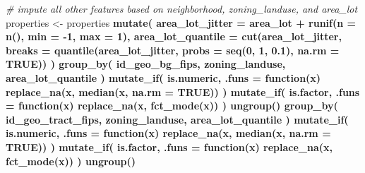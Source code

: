 \documentclass[]{book}
\newenvironment{Shaded}{\begin{snugshade}}{\end{snugshade}}
\newcommand{\KeywordTok}[1]{\textcolor[rgb]{0.13,0.29,0.53}{\textbf{#1}}}
\newcommand{\DataTypeTok}[1]{\textcolor[rgb]{0.13,0.29,0.53}{#1}}
\newcommand{\DecValTok}[1]{\textcolor[rgb]{0.00,0.00,0.81}{#1}}
\newcommand{\FloatTok}[1]{\textcolor[rgb]{0.00,0.00,0.81}{#1}}
\newcommand{\StringTok}[1]{\textcolor[rgb]{0.31,0.60,0.02}{#1}}
\newcommand{\CommentTok}[1]{\textcolor[rgb]{0.56,0.35,0.01}{\textit{#1}}}
\newcommand{\OtherTok}[1]{\textcolor[rgb]{0.56,0.35,0.01}{#1}}
\newcommand{\ControlFlowTok}[1]{\textcolor[rgb]{0.13,0.29,0.53}{\textbf{#1}}}
\newcommand{\OperatorTok}[1]{\textcolor[rgb]{0.81,0.36,0.00}{\textbf{#1}}}
\newcommand{\NormalTok}[1]{#1}
\theoremstyle{definition}
\theoremstyle{definition}
\theoremstyle{definition}
\theoremstyle{remark}
\begin{document}
\begin{Shaded}
\begin{Highlighting}[]
\CommentTok{# impute all other features based on neighborhood, zoning_landuse, and area_lot}
\NormalTok{properties <-}\StringTok{ }\NormalTok{properties }\OperatorTok{%
\StringTok{  }\KeywordTok{mutate}\NormalTok{(}
    \DataTypeTok{area_lot_jitter =}\NormalTok{ area_lot }\OperatorTok{+}\StringTok{ }\KeywordTok{runif}\NormalTok{(}\DataTypeTok{n =} \KeywordTok{n}\NormalTok{(), }\DataTypeTok{min =} \OperatorTok{-}\DecValTok{1}\NormalTok{, }\DataTypeTok{max =} \DecValTok{1}\NormalTok{),}
    \DataTypeTok{area_lot_quantile =} \KeywordTok{cut}\NormalTok{(area_lot_jitter, }
                            \DataTypeTok{breaks =} \KeywordTok{quantile}\NormalTok{(area_lot_jitter, }\DataTypeTok{probs =} \KeywordTok{seq}\NormalTok{(}\DecValTok{0}\NormalTok{, }\DecValTok{1}\NormalTok{, }\FloatTok{0.1}\NormalTok{), }\DataTypeTok{na.rm =} \OtherTok{TRUE}\NormalTok{))}
\NormalTok{    ) }\OperatorTok{%
\StringTok{  }\KeywordTok{group_by}\NormalTok{(}
\NormalTok{    id_geo_bg_fips,}
\NormalTok{    zoning_landuse,}
\NormalTok{    area_lot_quantile}
\NormalTok{  ) }\OperatorTok{%
\StringTok{  }\KeywordTok{mutate_if}\NormalTok{(}
\NormalTok{    is.numeric, }\DataTypeTok{.funs =} \ControlFlowTok{function}\NormalTok{(x) }\KeywordTok{replace_na}\NormalTok{(x, }\KeywordTok{median}\NormalTok{(x, }\DataTypeTok{na.rm =} \OtherTok{TRUE}\NormalTok{))}
\NormalTok{    ) }\OperatorTok{%
\StringTok{  }\KeywordTok{mutate_if}\NormalTok{(}
\NormalTok{    is.factor, }\DataTypeTok{.funs =} \ControlFlowTok{function}\NormalTok{(x) }\KeywordTok{replace_na}\NormalTok{(x, }\KeywordTok{fct_mode}\NormalTok{(x))}
\NormalTok{  ) }\OperatorTok{%
\StringTok{  }\KeywordTok{ungroup}\NormalTok{() }\OperatorTok{%
\StringTok{  }\KeywordTok{group_by}\NormalTok{(}
\NormalTok{    id_geo_tract_fips,}
\NormalTok{    zoning_landuse,}
\NormalTok{    area_lot_quantile}
\NormalTok{  ) }\OperatorTok{%
\StringTok{  }\KeywordTok{mutate_if}\NormalTok{(}
\NormalTok{    is.numeric, }\DataTypeTok{.funs =} \ControlFlowTok{function}\NormalTok{(x) }\KeywordTok{replace_na}\NormalTok{(x, }\KeywordTok{median}\NormalTok{(x, }\DataTypeTok{na.rm =} \OtherTok{TRUE}\NormalTok{))}
\NormalTok{  ) }\OperatorTok{%
\StringTok{  }\KeywordTok{mutate_if}\NormalTok{(}
\NormalTok{    is.factor, }\DataTypeTok{.funs =} \ControlFlowTok{function}\NormalTok{(x) }\KeywordTok{replace_na}\NormalTok{(x, }\KeywordTok{fct_mode}\NormalTok{(x))}
\NormalTok{  ) }\OperatorTok{%
\StringTok{  }\KeywordTok{ungroup}\NormalTok{() }\OperatorTok{%
}}}}}}}}}}
\end{Highlighting}
\end{Shaded}
\end{document}
